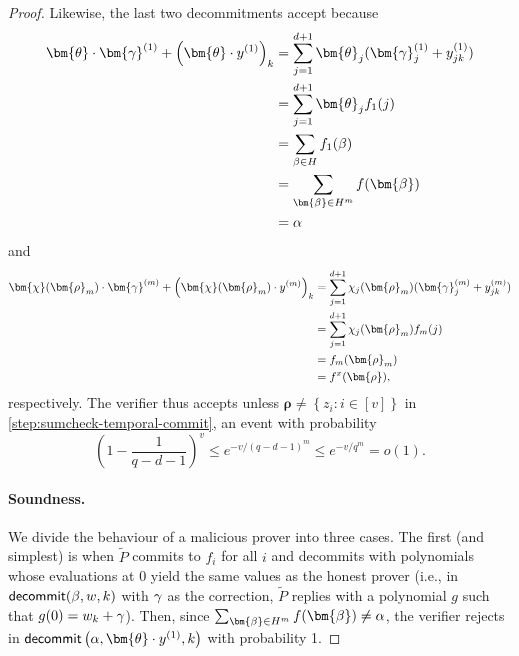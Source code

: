 \documentclass[a4paper,UKenglish,cleveref, autoref, thm-restate]{lipics-v2021}
\theoremstyle{definition}
\renewcommand{\set}[1]{\left\{#1\right\}}
\newcommand{\vcommitlength}{v}
\newcommand{\vcommitstring}{z}
\newcommand{\pcommitstring}{y}
\newcommand{\dimension}{m}
\newcommand{\degree}{d}
\newcommand{\fieldsize}{q}
\newcommand{\evaluationpoint}{\bm{\fe2}}
\newcommand{\fingerprinttuple}{\bm{\rho}}
\newcommand{\cubeside}{H}
\def\fe#1{
    \ifnum#1=1
        \alpha
    \else
    \ifnum#1=2
        \beta
    \else
    \ifnum#1=3
        \gamma
    \fi\fi\fi
}
\begin{document}
\begin{proof}
    Likewise, the last two decommitments accept because
    \begin{align*}
        \bm{\theta} \cdot \bm{\fe3}^{(1)} + \left(\bm{\theta} \cdot \pcommitstring^{(1)}\right)_k &= \sum_{j = 1}^{\degree + 1} \bm{\theta}_j (\bm{\fe3}^{(1)}_j + \pcommitstring^{(1)}_{jk})\\
        &= \sum_{j = 1}^{\degree + 1} \bm{\theta}_j f_1(j)\\
        &= \sum_{\fe2 \in \cubeside} f_1(\fe2)\\
        &= \sum_{\evaluationpoint \in \cubeside^\dimension} f(\evaluationpoint)\\
        &= \fe1
    \end{align*}
    and
    \begin{align*}
        \bm{\chi}(\fingerprinttuple_\dimension) \cdot \bm{\fe3}^{(\dimension)} + \left(\bm{\chi}(\fingerprinttuple_\dimension) \cdot \pcommitstring^{(\dimension)}\right)_k &= \sum_{j = 1}^{\degree + 1} \chi_j(\fingerprinttuple_\dimension) (\bm{\fe3}^{(\dimension)}_j + \pcommitstring^{(\dimension)}_{jk})\\
        &= \sum_{j = 1}^{\degree + 1} \chi_j(\fingerprinttuple_\dimension) f_\dimension(j)\\
        &= f_\dimension(\fingerprinttuple_\dimension)\\
        &= f^x(\fingerprinttuple),
    \end{align*}
    respectively. The verifier thus accepts unless $\fingerprinttuple \neq \set{\vcommitstring_i : i \in [\vcommitlength]}$ in \cref{step:sumcheck-temporal-commit}, an event with probability
    \begin{equation*}
        \left(1 - \frac1{\fieldsize - \degree - 1}\right)^\vcommitlength \leq e^{-\vcommitlength / (\fieldsize - \degree - 1)^\dimension} \leq e^{-\vcommitlength/\fieldsize^\dimension} = o(1).
    \end{equation*}
    
    \paragraph*{Soundness\iflipics\else.\fi} We divide the behaviour of a malicious prover into three cases. The first (and simplest) is when $\widetilde P$ commits to $f_i$ for all $i$ and decommits with polynomials whose evaluations at $0$ yield the same values as the honest prover (i.e., in $\textsf{decommit}(\fe2, w, k)$ with $\fe3$ as the correction, $\widetilde P$ replies with a polynomial $g$ such that $g(0) = w_k + \fe3$). Then, since $\sum_{\evaluationpoint \in \cubeside^\dimension} f(\evaluationpoint) \neq \fe1$, the verifier rejects in $\textsf{decommit}\left(\fe1, \bm{\theta} \cdot \pcommitstring^{(1)}, k\right)$ with probability 1.
    

\end{proof}
\end{document}
